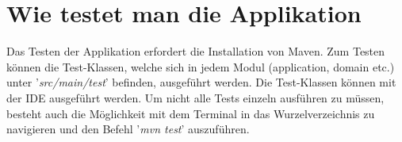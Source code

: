 \section{Wie testet man die Applikation}
Das Testen der Applikation erfordert die Installation von Maven. Zum Testen können die Test-Klassen, welche sich in jedem Modul (application, domain etc.) unter '\textit{src/main/test}' befinden, ausgeführt werden. Die Test-Klassen können mit der IDE ausgeführt werden. Um nicht alle Tests einzeln ausführen zu müssen, besteht auch die Möglichkeit mit dem Terminal in das Wurzelverzeichnis zu navigieren und den Befehl '\textit{mvn test}' auszuführen.